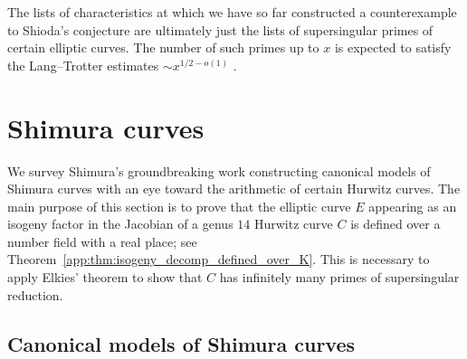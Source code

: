 \documentclass[main.tex]{subfiles}
\begin{document}
The lists of characteristics at which we have so far constructed a counterexample to Shioda's conjecture are ultimately just the lists of supersingular primes of certain elliptic curves. The number of such primes up to $x$ is expected to satisfy the Lang--Trotter estimates $\sim x^{1/2 - o(1)}$ \cite{lang:frobenius_distributions}.

\section{Shimura curves} \label{sec:shimura}

We survey Shimura's groundbreaking work \cite{shimura:curves} constructing canonical models of Shimura curves with an eye toward the arithmetic of certain Hurwitz curves. The main purpose of this section is to prove that the elliptic curve $E$ appearing as an isogeny factor in the Jacobian of a genus $14$ Hurwitz curve $C$ is defined over a number field with a real place; see Theorem~\ref{app:thm:isogeny_decomp_defined_over_K}. This is necessary to apply Elkies' theorem \cite{elkies:supersingular} to show that $C$ has infinitely many primes of supersingular reduction.

\subsection{Canonical models of Shimura curves}
\end{document}
